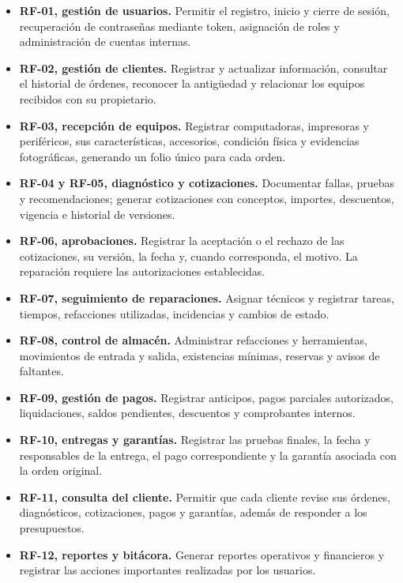 \begin{itemize}
    \item \textbf{RF-01, gestión de usuarios.} Permitir el registro, inicio y cierre de sesión, recuperación de contraseñas mediante token, asignación de roles y administración de cuentas internas.
    \item \textbf{RF-02, gestión de clientes.} Registrar y actualizar información, consultar el historial de órdenes, reconocer la antigüedad y relacionar los equipos recibidos con su propietario.
    \item \textbf{RF-03, recepción de equipos.} Registrar computadoras, impresoras y periféricos, sus características, accesorios, condición física y evidencias fotográficas, generando un folio único para cada orden.
    \item \textbf{RF-04 y RF-05, diagnóstico y cotizaciones.} Documentar fallas, pruebas y recomendaciones; generar cotizaciones con conceptos, importes, descuentos, vigencia e historial de versiones.
    \item \textbf{RF-06, aprobaciones.} Registrar la aceptación o el rechazo de las cotizaciones, su versión, la fecha y, cuando corresponda, el motivo. La reparación requiere las autorizaciones establecidas.
    \item \textbf{RF-07, seguimiento de reparaciones.} Asignar técnicos y registrar tareas, tiempos, refacciones utilizadas, incidencias y cambios de estado.
    \item \textbf{RF-08, control de almacén.} Administrar refacciones y herramientas, movimientos de entrada y salida, existencias mínimas, reservas y avisos de faltantes.
    \item \textbf{RF-09, gestión de pagos.} Registrar anticipos, pagos parciales autorizados, liquidaciones, saldos pendientes, descuentos y comprobantes internos.
    \item \textbf{RF-10, entregas y garantías.} Registrar las pruebas finales, la fecha y responsables de la entrega, el pago correspondiente y la garantía asociada con la orden original.
    \item \textbf{RF-11, consulta del cliente.} Permitir que cada cliente revise sus órdenes, diagnósticos, cotizaciones, pagos y garantías, además de responder a los presupuestos.
    \item \textbf{RF-12, reportes y bitácora.} Generar reportes operativos y financieros y registrar las acciones importantes realizadas por los usuarios.
\end{itemize}

